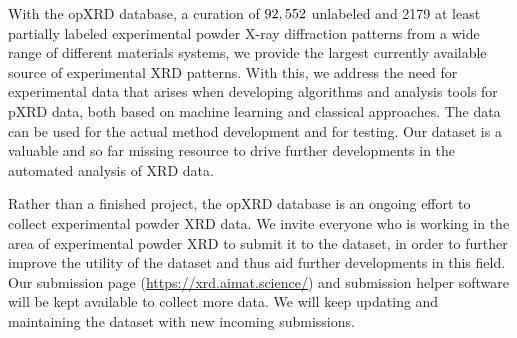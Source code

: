 With the opXRD database, a curation of $92,552$ unlabeled and 2179 at least partially labeled experimental powder X-ray diffraction patterns from a wide range of different materials systems, we provide the largest currently available source of experimental XRD patterns. With this, we address the need for experimental data that arises when developing algorithms and analysis tools for pXRD data, both based on machine learning and classical approaches. The data can be used for the actual method development and for testing. Our dataset is a valuable and so far missing resource to drive further developments in the automated analysis of XRD data. 

Rather than a finished project, the opXRD database is an ongoing effort to collect experimental powder XRD data. We invite everyone who is working in the area of experimental powder XRD to submit it to the dataset, in order to further improve the utility of the dataset and thus aid further developments in this field. Our submission page (\url{https://xrd.aimat.science/}) and submission helper software will be kept available to collect more data. We will keep updating and maintaining the dataset with new incoming submissions.
